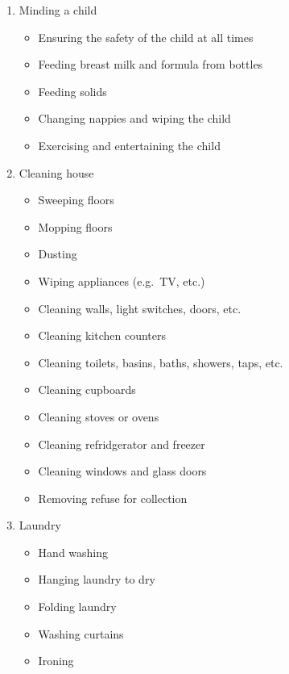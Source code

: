 \documentclass[a4paper,11pt]{article}
\begin{document}
\begin{enumerate}
  \item Minding a child
    \begin{itemize}
      \item Ensuring the safety of the child at all times
      \item Feeding breast milk and formula from bottles
      \item Feeding solids
      \item Changing nappies and wiping the child
      \item Exercising and entertaining the child
    \end{itemize}
  \item Cleaning house
    \begin{itemize}
      \item Sweeping floors
      \item Mopping floors
      \item Dusting
      \item Wiping appliances (e.g.\ TV, etc.)
      \item Cleaning walls, light switches, doors, etc.
      \item Cleaning kitchen counters
      \item Cleaning toilets, basins, baths, showers, taps, etc.
      \item Cleaning cupboards
      \item Cleaning stoves or ovens
      \item Cleaning refridgerator and freezer
      \item Cleaning windows and glass doors
      \item Removing refuse for collection
    \end{itemize}
  \item Laundry
    \begin{itemize}
      \item Hand washing
      \item Hanging laundry to dry
      \item Folding laundry
      \item Washing curtains
      \item Ironing
    \end{itemize}
\end{enumerate}
\end{document}
